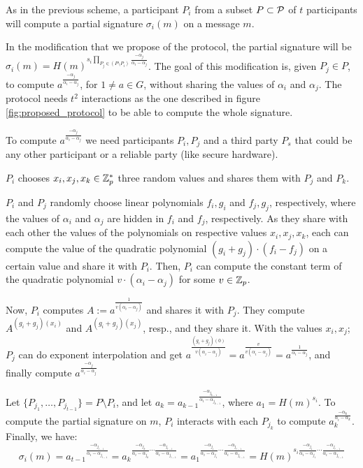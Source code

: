 As in the previous scheme, a participant $P_i$ from a subset $P \subset {\mathcal P}$ of $t$ participants will compute a partial signature $\sigma_i (m)$ on a message $m$.

In the modification that we propose of the protocol, the partial signature will be $\sigma_i (m) = H(m)^{s_i \prod_{P_j \in (P \setminus P_i)} \frac{-\alpha_j}{\alpha_i - \alpha_j}}$. The goal of this modification is, given $P_j \in P$, to compute $a^\frac{-\alpha_j}{\alpha_i - \alpha_j}$, for $1 \neq a \in G$, without sharing the values of $\alpha_i$ and $\alpha_j$. The protocol needs $t^2$ interactions as the one described in figure \ref{fig:proposed_protocol} to be able to compute the whole signature.

To compute $a^\frac{-\alpha_j}{\alpha_i - \alpha_j}$ we need participants $P_i,P_j$ and a third party $P_s$ that could be any other participant or a reliable party (like secure hardware).

$P_i$ chooses $x_i, x_j, x_k \in {\mathbb Z}^*_p$ three random values and shares them with $P_j$ and $P_k$.

$P_i$ and $P_j$ randomly choose linear polynomials $f_i, g_i$ and $f_j, g_j$, respectively, where the values of $\alpha_i$ and $\alpha_j$ are hidden in $f_i$ and $f_j$, respectively. As they share with each other the values of the polynomials on respective values $x_i, x_j, x_k$, each can compute the value of the quadratic polynomial $(g_i+g_j) \cdot (f_i - f_j)$ on a certain value and share it with $P_i$. Then, $P_i$ can compute the constant term of the quadratic polynomial $v \cdot (\alpha_i - \alpha_j)$ for some $v \in {\mathbb Z}_p$.

Now, $P_i$ computes $A := a^{\frac{1}{v(\alpha_i - \alpha_j)}}$ and shares it with $P_j$. They compute $A^{(g_i + g_j)(x_i)}$ and $A^{(g_i + g_j)(x_j)}$, resp., and they share it. With the values $x_i, x_j$; $P_j$ can do exponent interpolation and get $ a^{\frac{(g_i + g_j)(0)}{v(\alpha_i - \alpha_j)}} = a^{\frac{v}{v(\alpha_i - \alpha_j)}} = a^{\frac{1}{\alpha_i - \alpha_j}}$, and finally compute $a^{\frac{-\alpha_j}{\alpha_i - \alpha_j}}$

Let $\{ P_{j_1}, \dots , P_{j_{t-1}} \} = P \setminus P_i$, and let $a_k =  a_{k-1} {}^{\frac{- \alpha_{j_{k-1}}}{\alpha_{i} - \alpha_{j_{k-1}}}}$, where $a_1 = H(m)^{s_i}$. To compute the partial signature on $m$, $P_i$ interacts with each $P_{j_k}$ to compute $a_k^{\frac{-\alpha_k}{\alpha_i - \alpha_k}}$. Finally, we have:
$$
\sigma_i (m)
= a_{t-1} {}^{\frac{- \alpha_{j_{t-1}}}{\alpha_{i} - \alpha_{j_{t-1}}}}
= a_k {}^{\frac{- \alpha_{j_{k}}}{\alpha_{i} - \alpha_{j_{k}}} \cdots \frac{- \alpha_{j_{t-1}}}{\alpha_{i} - \alpha_{j_{t-1}}}}
= a_1 {}^{\frac{- \alpha_{j_{1}}}{\alpha_{i} - \alpha_{j_{1}}} \cdots \frac{- \alpha_{j_{t-1}}}{\alpha_{i} - \alpha_{j_{t-1}}}}
= H(m)^{ s_i \frac{- \alpha_{j_{1}}}{\alpha_{i} - \alpha_{j_{1}}} \cdots \frac{- \alpha_{j_{t-1}}}{\alpha_{i} - \alpha_{j_{t-1}}}}
$$

